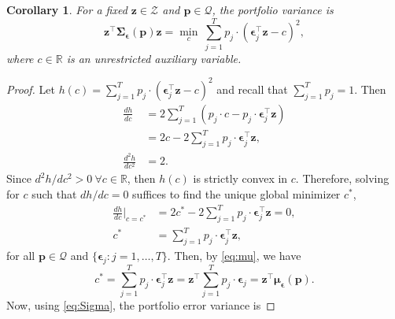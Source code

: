 \documentclass[10pt, twocolumn]{article}
\newtheorem{corollary}[theorem]{Corollary}
\theoremstyle{plain}
\theoremstyle{definition}
\begin{document}
\begin{appendices}
\begin{corollary}
\label{coroll:variance}
	For a fixed \(\bm{z}\in\mathcal{Z}\) and \(\bm{p}\in\mathcal{Q}\), 
	the portfolio variance is 
	\[
		\bm{z}^\top \bm{\Sigma}_{\bm{\epsilon}}(\bm{p}) \bm{z} =
                \min_{c}\ \sum_{j=1}^T p_j\cdot (\bm{\epsilon}_j^\top
                \bm{z} - c)^2, 
	\]
	where \(c\in\mathbb{R}\) is an unrestricted auxiliary variable.
\end{corollary}
\begin{proof}
	Let \(h(c) = \sum_{j=1}^T p_j\cdot (\bm{\epsilon}_j^\top \bm{z} -
        c)^2\) and recall that \(\sum_{j=1}^T p_j = 1\). Then 
	\begin{align}
		\frac{dh}{dc} &= 2 \sum_{j=1}^T (p_j\cdot c - p_j\cdot \bm{\epsilon}_j^\top \bm{z})\nonumber\\
			&= 2c - 2\sum_{j=1}^T p_j\cdot \bm{\epsilon}_j^\top \bm{z},\nonumber\\
		\frac{d^2 h}{dc^2} &= 2.\nonumber
	\end{align}
	Since \(d^2 h/dc^2 > 0\ \forall c\in\mathbb{R}\), then \(h(c)\) is
        strictly convex in \(c\). Therefore, solving for \(c\) such that
        \(dh/dc = 0\) suffices to find the unique global minimizer
        \(c^*\),  
	\[
	\begin{aligned}
		\frac{dh}{dc}\bigg|_{c=c^*} &= 2c^* - 2\sum_{j=1}^T
                p_j\cdot \bm{\epsilon}_j^\top \bm{z} = 0,\\
		c^* &= \sum_{j=1}^T p_j\cdot \bm{\epsilon}_j^\top \bm{z},
	\end{aligned}
	\]
	for all \(\bm{p}\in\mathcal{Q}\) and \(\{\bm{\epsilon}_j: j = 1, \ldots, T\}\). Then, by \eqref{eq:mu}, we have
	\[
		c^* = \sum_{j=1}^T p_j\cdot \bm{\epsilon}_j^\top \bm{z} =
                \bm{z}^\top \sum_{j=1}^T p_j\cdot \bm{\epsilon}_j =
                \bm{z}^\top \bm{\mu}_{\bm{\epsilon}}(\bm{p}).
	\]
	Now, using \eqref{eq:Sigma}, the portfolio error variance is

\end{proof}
\end{appendices}
\end{document}

